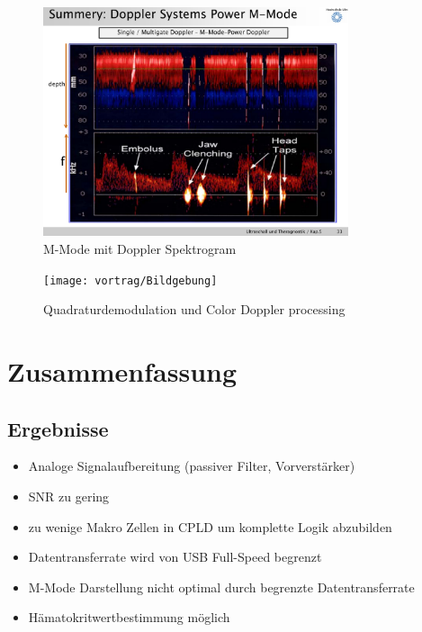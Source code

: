 \documentclass{beamer}
\newcommand*\tick{\item[\Checkmark]}
\newcommand*\fail{\item[\XSolidBrush]}
\begin{document}
\begin{frame}
\begin{figure}[b]
	\centering
  	\includegraphics[trim = 2.2cm 1cm 1.3cm 3.5cm, clip=true, width=0.8\textwidth]{M-Mode}  
  	\caption{M-Mode mit Doppler Spektrogram}
  \end{figure}
\end{frame}

\begin{frame}
\begin{figure}[b]
	\centering
  	\texttt{[image: vortrag/Bildgebung]}  
  	\caption{Quadraturdemodulation und Color Doppler processing}
  \end{figure}
\end{frame}

\section{Zusammenfassung}
\subsection{Ergebnisse}
\begin{frame}
\begin{itemize}
	\tick Analoge Signalaufbereitung (passiver Filter, Vorverstärker)
	\fail SNR zu gering
	\fail zu wenige Makro Zellen in CPLD um komplette Logik abzubilden
	\fail Datentransferrate wird von USB Full-Speed begrenzt
	\fail M-Mode Darstellung nicht optimal durch begrenzte Datentransferrate
	\tick Hämatokritwertbestimmung möglich
\end{itemize}
\end{frame}
\end{document}
